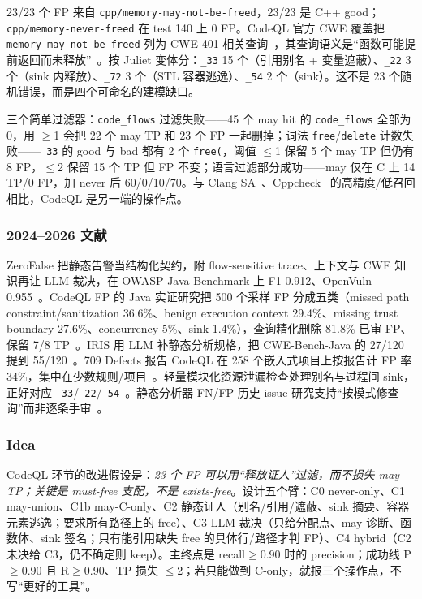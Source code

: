 \documentclass[conference]{IEEEtran}
\begin{document}
23/23 个 FP 来自 \texttt{cpp/memory-may-not-be-freed}，23/23 是 C++ good；\texttt{cpp/memory-never-freed} 在 test 140 上 0 FP。CodeQL 官方 CWE 覆盖把 \texttt{memory-may-not-be-freed} 列为 CWE-401 相关查询~\cite{codeqlcwe}，其查询语义是“函数可能提前返回而未释放”~\cite{codeqlmay}。按 Juliet 变体分：\texttt{\_33} 15 个（引用别名 + 变量遮蔽）、\texttt{\_22} 3 个（sink 内释放）、\texttt{\_72} 3 个（STL 容器逃逸）、\texttt{\_54} 2 个（sink）。这不是 23 个随机错误，而是四个可命名的建模缺口。

三个简单过滤器：\texttt{code\_flows} 过滤失败——45 个 may hit 的 \texttt{code\_flows} 全部为 0，用 $\ge$1 会把 22 个 may TP 和 23 个 FP 一起删掉；词法 \texttt{free}/\texttt{delete} 计数失败——\texttt{\_33} 的 good 与 bad 都有 2 个 \texttt{free(}，阈值 $\le$1 保留 5 个 may TP 但仍有 8 FP，$\le$2 保留 15 个 TP 但 FP 不变；语言过滤部分成功——may 仅在 C 上 14 TP/0 FP，加 never 后 60/0/10/70。与 Clang SA~\cite{clangsa}、Cppcheck~\cite{cppcheck} 的高精度/低召回相比，CodeQL 是另一端的操作点。

\subsubsection{2024--2026 文献}

ZeroFalse 把静态告警当结构化契约，附 flow-sensitive trace、上下文与 CWE 知识再让 LLM 裁决，在 OWASP Java Benchmark 上 F1 0.912、OpenVuln 0.955~\cite{iranmanesh2025zerofalse}。CodeQL FP 的 Java 实证研究把 500 个采样 FP 分成五类（missed path constraint/sanitization 36.6\%、benign execution context 29.4\%、missing trust boundary 27.6\%、concurrency 5\%、sink 1.4\%），查询精化删除 81.8\% 已审 FP、保留 7/8 TP~\cite{sajadi2026codeqlfp}。IRIS 用 LLM 补静态分析规格，把 CWE-Bench-Java 的 27/120 提到 55/120~\cite{li2025iris}。709 Defects 报告 CodeQL 在 258 个嵌入式项目上按报告计 FP 率 34\%，集中在少数规则/项目~\cite{shen2025finding709}。轻量模块化资源泄漏检查处理别名与过程间 sink，正好对应 \texttt{\_33}/\texttt{\_22}/\texttt{\_54}~\cite{shadab2025resourceleak}。静态分析器 FN/FP 历史 issue 研究支持“按模式修查询”而非逐条手审~\cite{cui2024fnfp}。

\subsubsection{Idea}

CodeQL 环节的改进假设是：\emph{23 个 FP 可以用“释放证人”过滤，而不损失 may TP；关键是 must-free 支配，不是 exists-free}。设计五个臂：C0 never-only、C1 may-union、C1b may-C-only、C2 静态证人（别名/引用/遮蔽、sink 摘要、容器元素逃逸；要求所有路径上的 free）、C3 LLM 裁决（只给分配点、may 诊断、函数体、sink 签名；只有能引用缺失 free 的具体行/路径才判 FP）、C4 hybrid（C2 未决给 C3，仍不确定则 keep）。主终点是 recall$\ge$0.90 时的 precision；成功线 P$\ge$0.90 且 R$\ge$0.90、TP 损失 $\le$2；若只能做到 C-only，就报三个操作点，不写“更好的工具”。
\end{document}
